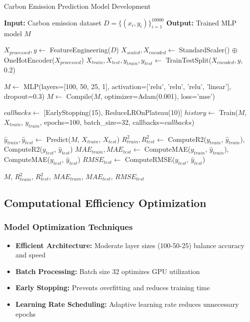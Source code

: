 \documentclass[12pt,a4paper]{article}
\begin{document}
\begin{algorithm}[H]
\caption{Carbon Emission Prediction Model Development}
\begin{algpseudocode}[1]
\State \textbf{Input:} Carbon emission dataset $D = \{(x_i, y_i)\}_{i=1}^{10000}$
\State \textbf{Output:} Trained MLP model $M$

\State {}
\State $X_{processed}, y \leftarrow$ FeatureEngineering($D$)
\State $X_{scaled}, X_{encoded} \leftarrow$ StandardScaler() $\oplus$ OneHotEncoder($X_{processed}$)
\State $X_{train}, X_{test}, y_{train}, y_{test} \leftarrow$ TrainTestSplit($X_{encoded}, y$, 0.2)

\State {}
\State $M \leftarrow$ MLP(layers=[100, 50, 25, 1], activation=['relu', 'relu', 'relu', 'linear'], dropout=0.3)
\State $M \leftarrow$ Compile($M$, optimizer=Adam(0.001), loss='mse')

\State {}
\State $callbacks \leftarrow$ [EarlyStopping(15), ReduceLROnPlateau(10)]
\State $history \leftarrow$ Train($M$, $X_{train}$, $y_{train}$, epochs=100, batch\_size=32, callbacks=$callbacks$)

\State {}
\State $\hat{y}_{train}, \hat{y}_{test} \leftarrow$ Predict($M$, $X_{train}$, $X_{test}$)
\State $R^2_{train}, R^2_{test} \leftarrow$ ComputeR2($y_{train}$, $\hat{y}_{train}$), ComputeR2($y_{test}$, $\hat{y}_{test}$)
\State $MAE_{train}, MAE_{test} \leftarrow$ ComputeMAE($y_{train}$, $\hat{y}_{train}$), ComputeMAE($y_{test}$, $\hat{y}_{test}$)
\State $RMSE_{test} \leftarrow$ ComputeRMSE($y_{test}$, $\hat{y}_{test}$)

\State \Return $M$, $R^2_{train}$, $R^2_{test}$, $MAE_{train}$, $MAE_{test}$, $RMSE_{test}$
\end{algpseudocode}
\end{algorithm}

\subsection{Computational Efficiency Optimization}

\subsubsection{Model Optimization Techniques}
\begin{itemize}
    \item \textbf{Efficient Architecture:} Moderate layer sizes (100-50-25) balance accuracy and speed
    \item \textbf{Batch Processing:} Batch size 32 optimizes GPU utilization
    \item \textbf{Early Stopping:} Prevents overfitting and reduces training time
    \item \textbf{Learning Rate Scheduling:} Adaptive learning rate reduces unnecessary epochs
\end{itemize}
\end{document}
